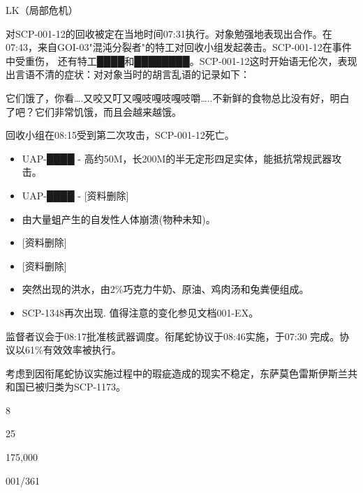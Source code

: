 LK（局部危机）

对SCP-001-12的回收被定在当地时间07:31执行。对象勉强地表现出合作。在07:43，来自GOI-03"混沌分裂者"的特工对回收小组发起袭击。SCP-001-12在事件中受重伤， 还有特工████和████████。SCP-001-12这时开始语无伦次，表现出言语不清的症状：对对象当时的胡言乱语的记录如下：

\begin{scpbox}

它们饿了，你看….又咬又叮又嘎吱嘎吱嘎吱嚼…..不新鲜的食物总比没有好，明白了吧？它们非常饥饿，而且会越来越饿。

\end{scpbox}

回收小组在08:15受到第二次攻击，SCP-001-12死亡。


\begin{itemize}
	\item UAP-████ - 高约50M，长200M的半无定形四足实体，能抵抗常规武器攻击。
	\item UAP-████ - [资料删除]
	\item 由大量蛆产生的自发性人体崩溃(物种未知)。
	\item {[资料删除]}
	\item {[资料删除]}
	\item 突然出现的洪水，由2\%巧克力牛奶、原油、鸡肉汤和兔粪便组成。
	\item SCP-1348再次出现. 值得注意的变化参见文档001-EX。
\end{itemize}

监督者议会于08:17批准核武器调度。衔尾蛇协议于08:46实施，于07:30 完成。协议以61\%有效效率被执行。

考虑到因衔尾蛇协议实施过程中的瑕疵造成的现实不稳定，东萨莫色雷斯伊斯兰共和国已被归类为SCP-1173。

 8

 25

175,000




001/361


